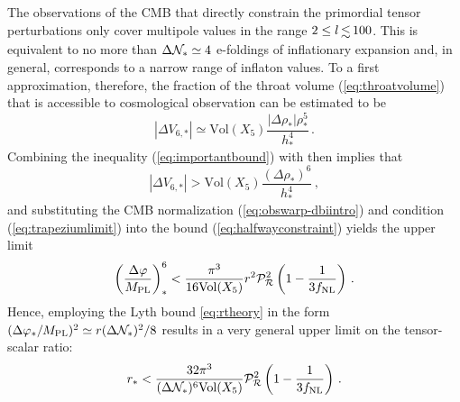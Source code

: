 The observations of the CMB 
that directly constrain the primordial tensor perturbations only 
cover multipole values in the range $2 \le l \, \lsim \, 100$. 
This is equivalent to no more than ${\Delta \mathcal{N}_{*}} \simeq {4}$ 
e-foldings of inflationary expansion and, in general,   
corresponds to a narrow range of inflaton values. 
To a first approximation, therefore, the fraction of the throat volume 
(\ref{eq:throatvolume}) that is accessible to cosmological 
observation can be estimated to be 
% 
\begin{equation}
\label{eq:trapezium}
| \Delta V_{6,*} | \simeq \mathrm{Vol}(X_5) 
\frac{|\Delta \rho_*| \rho^5_{*}}{h^{4}_{*}} \,.
\end{equation}
% 
Combining the inequality (\ref{eq:importantbound}) with  
then implies that 
% 
\begin{equation}
\label{eq:trapeziumlimit}
|\Delta V _{6,*}| > \mathrm{Vol}(X_5) 
\frac{(\Delta \rho_* )^6}{h^{4}_*}  \,,
\end{equation}
% 
and substituting the CMB normalization (\ref{eq:obswarp-dbiintro}) and 
condition (\ref{eq:trapeziumlimit}) into the bound (\ref{eq:halfwayconstraint}) 
yields the upper limit   
% 
\begin{equation}
\label{eq:boundpower6}
\left( \frac{\Delta \varphi}{M_{\mathrm{PL}}} \right)^6_{*} 
< \frac{\pi^3}{16\mathrm{Vol}(X_5)} r^2 \mathcal{P}_{\mathcal{R}}^2  
\left( 1- \frac{1}{3f_{\mathrm{NL}}} \right)  \,.
\end{equation}
% 
Hence, employing the Lyth bound \eqref{eq:rtheory} in the form
$(\Delta \varphi_* / M_{\mathrm{PL}} )^2 \simeq 
r (\Delta \mathcal{N}_*)^2 /8$  
results in a very general upper limit on the tensor-scalar ratio: 
% 
\begin{equation}
\label{eq:generalbound}
r_{*} < \frac{32 \pi^3}{(\Delta \mathcal{N}_*)^6 \mathrm{Vol}(X_5)} 
\mathcal{P}_{\mathcal{R}}^2  \left( 1- \frac{1}{3f_{\mathrm{NL}}} \right) \,.
\end{equation}
% 


